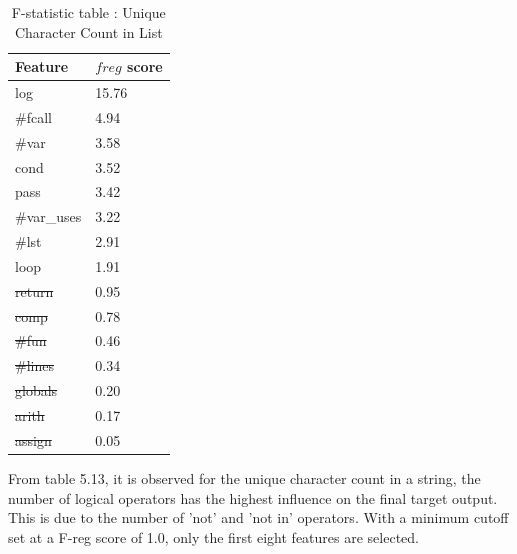 \begin{itemize}
\begin{table}[H]
\centering
\begin{tabular}{ll}
\hline
\multicolumn{1}{|l|}{\textbf{Feature}} & \multicolumn{1}{l|}{\textbf{$f{reg}$ score}} \\ \hline
\multicolumn{1}{|l|}{log}              & \multicolumn{1}{l|}{15.76}                 \\ \hline
\multicolumn{1}{|l|}{\#fcall}          & \multicolumn{1}{l|}{4.94}                  \\ \hline
\multicolumn{1}{|l|}{\#var}            & \multicolumn{1}{l|}{3.58}                  \\ \hline
\multicolumn{1}{|l|}{cond}             & \multicolumn{1}{l|}{3.52}                  \\ \hline
\multicolumn{1}{|l|}{pass}             & \multicolumn{1}{l|}{3.42}                  \\ \hline
\multicolumn{1}{|l|}{\#var\_uses}      & \multicolumn{1}{l|}{3.22}                  \\ \hline
\multicolumn{1}{|l|}{\#lst}            & \multicolumn{1}{l|}{2.91}                  \\ \hline
\multicolumn{1}{|l|}{loop}             & \multicolumn{1}{l|}{1.91}                  \\ \hline
\multicolumn{1}{|l|}{\st{return}}           & \multicolumn{1}{l|}{0.95}                  \\ \hline
\multicolumn{1}{|l|}{\st{comp}}             & \multicolumn{1}{l|}{0.78}                  \\ \hline
\multicolumn{1}{|l|}{\st{\#fun}}            & \multicolumn{1}{l|}{0.46}                  \\ \hline
\multicolumn{1}{|l|}{\st{\#lines}}          & \multicolumn{1}{l|}{0.34}                  \\ \hline
\multicolumn{1}{|l|}{\st{globals}}         & \multicolumn{1}{l|}{0.20}                  \\ \hline
\multicolumn{1}{|l|}{\st{arith}}            & \multicolumn{1}{l|}{0.17}                  \\ \hline
\multicolumn{1}{|l|}{\st{assign}}           & \multicolumn{1}{l|}{0.05}      
\\ \hline
\end{tabular}
\caption{F-statistic table : Unique Character Count in List}
\label{uc_f}
\end{table}

From table 5.13, it is observed for the unique character count in a string, the number of logical operators has the highest influence on the final target output. This is due to the number of 'not' and 'not in' operators. With a minimum cutoff set at a F-reg score of 1.0, only the first eight features are selected. 


\end{itemize}
